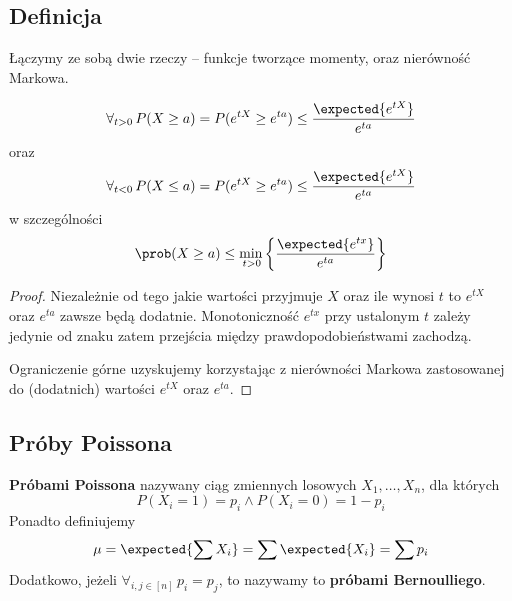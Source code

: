 \subsection{Definicja}
Łączymy ze sobą dwie rzeczy -- funkcje tworzące momenty, oraz nierówność Markowa.
\begin{theorem}
	\label{chernoff-inequality}
	\[
		\forall_{t > 0} \, P(X \geq a) = P(e^{tX} \geq e^{ta}) \leq \frac{\expected{e^{tX}}}{e^{ta}}
	\]
	oraz
	\[
		\forall_{t < 0} \, P(X \leq a) = P(e^{tX} \geq e^{ta}) \leq \frac{\expected{e^{tX}}}{e^{ta}}
	\]
    w szczególności
    \[
        \prob(X \geq a) \leq \min_{\, t > 0}\left\{ \frac{\expected{e^{tx}}}{e^{ta}} \right\}
    \]
\end{theorem}
\begin{proof}
	Niezależnie od tego jakie wartości przyjmuje \( X \) oraz ile wynosi \( t \) to \( e^{tX} \) oraz \( e^{ta} \) zawsze będą dodatnie.
	Monotoniczność \( e^{tx} \) przy ustalonym \( t \) zależy jedynie od znaku zatem przejścia między prawdopodobieństwami zachodzą.

	Ograniczenie górne uzyskujemy korzystając z nierówności Markowa zastosowanej do (dodatnich) wartości \( e^{tX} \) oraz \( e^{ta} \).
\end{proof}

\subsection{Próby Poissona}
\begin{definition}
	\textbf{Próbami Poissona} nazywany ciąg zmiennych losowych \( X_1, \dots, X_n \), dla których
	\[
		P(X_i = 1) = p_i \land P(X_i = 0) = 1 - p_i
	\]
	Ponadto definiujemy
	\[
		\mu = \expected{\sum X_i} = \sum \expected{X_i} = \sum p_i
	\]
    Dodatkowo, jeżeli \( \forall_{i,j \in [n]} \, p_i = p_j \), to nazywamy to \textbf{próbami Bernoulliego}.
\end{definition}

